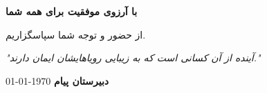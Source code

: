 \documentclass[aspectratio=169]{beamer}
\begin{document}
\begin{frame}[plain] %
  \centering %
  \vspace*{\fill} %

  \textcolor{myblue}{\Huge\textbf{با آرزوی موفقیت برای همه شما}}
  \vspace{0.75cm}

  \textcolor{mygold!90!black}{\Large از حضور و توجه شما سپاسگزاریم.} %
  \vspace{1cm}

  \begin{block}{} %
    \centering
    \Large\textit{"آینده از آن کسانی است که به زیبایی رویاهایشان ایمان دارند."}
  \end{block}

  \vspace{1cm}
  \textcolor{mygold}{\Large\textbf{دبیرستان پیام}}
  \vspace{0.25cm}
  \textcolor{myblue!75!black}{\normalsize\today}

  \vspace*{\fill} %
\end{frame}

\end{document}
